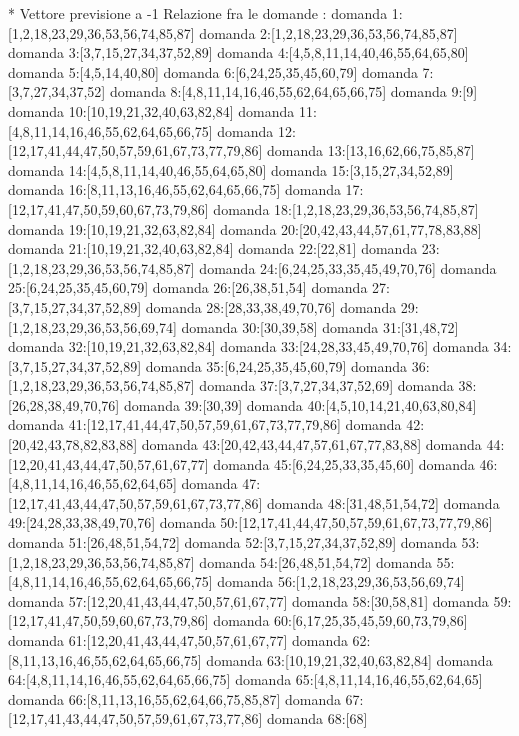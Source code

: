 * Vettore previsione a -1
Relazione fra le domande :
domanda 1:[1,2,18,23,29,36,53,56,74,85,87]
domanda 2:[1,2,18,23,29,36,53,56,74,85,87]
domanda 3:[3,7,15,27,34,37,52,89]
domanda 4:[4,5,8,11,14,40,46,55,64,65,80]
domanda 5:[4,5,14,40,80]
domanda 6:[6,24,25,35,45,60,79]
domanda 7:[3,7,27,34,37,52]
domanda 8:[4,8,11,14,16,46,55,62,64,65,66,75]
domanda 9:[9]
domanda 10:[10,19,21,32,40,63,82,84]
domanda 11:[4,8,11,14,16,46,55,62,64,65,66,75]
domanda 12:[12,17,41,44,47,50,57,59,61,67,73,77,79,86]
domanda 13:[13,16,62,66,75,85,87]
domanda 14:[4,5,8,11,14,40,46,55,64,65,80]
domanda 15:[3,15,27,34,52,89]
domanda 16:[8,11,13,16,46,55,62,64,65,66,75]
domanda 17:[12,17,41,47,50,59,60,67,73,79,86]
domanda 18:[1,2,18,23,29,36,53,56,74,85,87]
domanda 19:[10,19,21,32,63,82,84]
domanda 20:[20,42,43,44,57,61,77,78,83,88]
domanda 21:[10,19,21,32,40,63,82,84]
domanda 22:[22,81]
domanda 23:[1,2,18,23,29,36,53,56,74,85,87]
domanda 24:[6,24,25,33,35,45,49,70,76]
domanda 25:[6,24,25,35,45,60,79]
domanda 26:[26,38,51,54]
domanda 27:[3,7,15,27,34,37,52,89]
domanda 28:[28,33,38,49,70,76]
domanda 29:[1,2,18,23,29,36,53,56,69,74]
domanda 30:[30,39,58]
domanda 31:[31,48,72]
domanda 32:[10,19,21,32,63,82,84]
domanda 33:[24,28,33,45,49,70,76]
domanda 34:[3,7,15,27,34,37,52,89]
domanda 35:[6,24,25,35,45,60,79]
domanda 36:[1,2,18,23,29,36,53,56,74,85,87]
domanda 37:[3,7,27,34,37,52,69]
domanda 38:[26,28,38,49,70,76]
domanda 39:[30,39]
domanda 40:[4,5,10,14,21,40,63,80,84]
domanda 41:[12,17,41,44,47,50,57,59,61,67,73,77,79,86]
domanda 42:[20,42,43,78,82,83,88]
domanda 43:[20,42,43,44,47,57,61,67,77,83,88]
domanda 44:[12,20,41,43,44,47,50,57,61,67,77]
domanda 45:[6,24,25,33,35,45,60]
domanda 46:[4,8,11,14,16,46,55,62,64,65]
domanda 47:[12,17,41,43,44,47,50,57,59,61,67,73,77,86]
domanda 48:[31,48,51,54,72]
domanda 49:[24,28,33,38,49,70,76]
domanda 50:[12,17,41,44,47,50,57,59,61,67,73,77,79,86]
domanda 51:[26,48,51,54,72]
domanda 52:[3,7,15,27,34,37,52,89]
domanda 53:[1,2,18,23,29,36,53,56,74,85,87]
domanda 54:[26,48,51,54,72]
domanda 55:[4,8,11,14,16,46,55,62,64,65,66,75]
domanda 56:[1,2,18,23,29,36,53,56,69,74]
domanda 57:[12,20,41,43,44,47,50,57,61,67,77]
domanda 58:[30,58,81]
domanda 59:[12,17,41,47,50,59,60,67,73,79,86]
domanda 60:[6,17,25,35,45,59,60,73,79,86]
domanda 61:[12,20,41,43,44,47,50,57,61,67,77]
domanda 62:[8,11,13,16,46,55,62,64,65,66,75]
domanda 63:[10,19,21,32,40,63,82,84]
domanda 64:[4,8,11,14,16,46,55,62,64,65,66,75]
domanda 65:[4,8,11,14,16,46,55,62,64,65]
domanda 66:[8,11,13,16,55,62,64,66,75,85,87]
domanda 67:[12,17,41,43,44,47,50,57,59,61,67,73,77,86]
domanda 68:[68]
